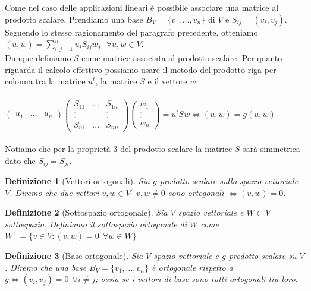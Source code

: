 \documentclass[a4paper,12pt]{report}
\newtheorem{definizione}{Definizione}[chapter]
\begin{document}
Come nel caso delle applicazioni lineari è possibile associare una matrice al prodotto scalare. Prendiamo una base $B_V=\{v_1,...,v_n\}$ di $V$ e $S_{ij}=(v_i,v_j)$. Seguendo lo stesso ragionamento del paragrafo precedente, otteniamo  $ \displaystyle (u,w)=\sum_{i,j=1}^nu_iS_{ij}w_j \ \ \ \forall u,w \in V$. \\ Dunque definiamo $S$ come matrice associata al prodotto scalare. Per quanto riguarda il calcolo effettivo possiamo usare il metodo del prodotto riga per colonna tra la matrice $u^t$, la matrice $S$ e il vettore $w$:
\\ 
\\$\begin{pmatrix}
    u_1 & ... &u_n
\end{pmatrix} 
\begin{pmatrix}
 S_{11}&...&S_{1n} \\
 . & & .           \\
 . & & .           \\
 S_{n1} &...&S_{nn}
\end{pmatrix}
\begin{pmatrix}
    w_1\\.\\.\\w_n
\end{pmatrix}=u^tSw \iff (u,w)=g(u,w)$
\\
\\Notiamo che per la proprietà 3 del prodotto scalare la matrice $S$ sarà simmetrica dato che $S_{ij}=S_{ji}$.

\begin{definizione}[Vettori ortogonali]
    Sia $g$ prodotto scalare sullo spazio vettoriale $V$. Diremo che due vettori $v,w \in V \ \  \ v,w \neq 0$ sono ortogonali $\iff (v,w)=0$.
\end{definizione}

\begin{definizione}[Sottospazio ortogonale]
    Sia $V$ spazio vettoriale e $W \subset V$ sottospazio. Definiamo il sottospazio ortogonale di $W$ come $W^{\perp}=\{v \in V: (v,w)=0 \ \ \forall w \in W\}$
\end{definizione}

\begin{definizione}[Base ortogonale]
    Sia $V$ spazio vettoriale e $g$ prodotto scalare su $V$. Diremo che una base $B_V=\{v_1,...,v_n\}$ è ortogonale rispetto a $g \iff (v_i,v_j)=0 \ \ \forall i \neq j$; ossia se i vettori di base sono tutti ortogonali tra loro.
\end{definizione}
\end{document}
